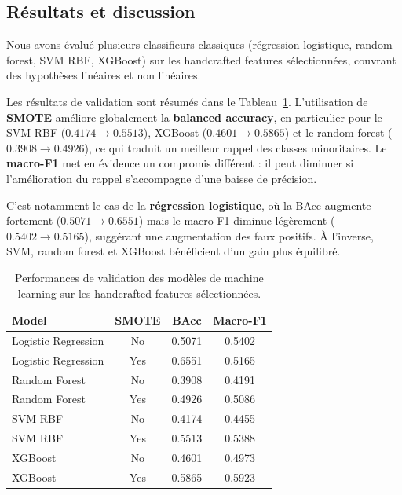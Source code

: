 \documentclass[journal,twocolumn]{IEEEtran}
\begin{document}
\subsection{Résultats et discussion}

Nous avons évalué plusieurs classifieurs classiques (régression logistique, random forest, SVM RBF, XGBoost) sur les handcrafted features sélectionnées, couvrant des hypothèses linéaires et non linéaires.

Les résultats de validation sont résumés dans le Tableau~\ref{tab:ml_results}. L’utilisation de \textbf{SMOTE} améliore globalement la \textbf{balanced accuracy}, en particulier pour le SVM RBF ($0.4174 \rightarrow 0.5513$), XGBoost ($0.4601 \rightarrow 0.5865$) et le random forest ($0.3908 \rightarrow 0.4926$), ce qui traduit un meilleur rappel des classes minoritaires. Le \textbf{macro-F1} met en évidence un compromis différent : il peut diminuer si l’amélioration du rappel s’accompagne d’une baisse de précision.

C’est notamment le cas de la \textbf{régression logistique}, où la BAcc augmente fortement ($0.5071 \rightarrow 0.6551$) mais le macro-F1 diminue légèrement ($0.5402 \rightarrow 0.5165$), suggérant une augmentation des faux positifs. À l’inverse, SVM, random forest et XGBoost bénéficient d’un gain plus équilibré.

\begin{table}[h]
\centering
\caption{Performances de validation des modèles de machine learning sur les handcrafted features sélectionnées.}
\label{tab:ml_results}
\begin{tabular}{|l|c|c|c|}
\hline
\textbf{Model} & \textbf{SMOTE} & \textbf{BAcc} & \textbf{Macro-F1} \\
\hline
Logistic Regression & No  & 0.5071 & 0.5402 \\
Logistic Regression & Yes & 0.6551 & 0.5165 \\
Random Forest       & No  & 0.3908 & 0.4191 \\
Random Forest       & Yes & 0.4926 & 0.5086 \\
SVM RBF             & No  & 0.4174 & 0.4455 \\
SVM RBF             & Yes & 0.5513 & 0.5388 \\
XGBoost             & No  & 0.4601 & 0.4973 \\
XGBoost             & Yes & 0.5865 & 0.5923 \\
\hline
\end{tabular}
\end{table}
\end{document}
